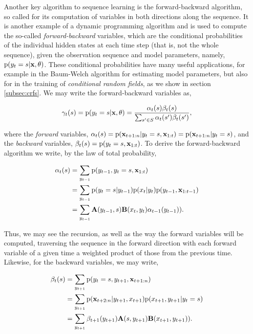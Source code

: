 Another key algorithm to sequence learning is the forward-backward algorithm, so called for its computation of variables in both directions along the sequence. It is another example of a dynamic programming algorithm and is used to compute the so-called \emph{forward-backward} variables, which are the conditional probabilities of the individual hidden states at each time step (that is, not the whole sequence), given the observation sequence and model parameters, namely, $\text{p}(y_t = s | \mathbf{x}, \theta)$. These conditional probabilities have many useful applications, for example in the Baum-Welch algorithm for estimating model parameters, but also for in the training of \emph{conditional random fields}, as we show in section \ref{subsec:crfs}. We may write the forward-backward variables as,

\begin{equation}
\gamma_t(s) = \text{p}(y_t = s | \mathbf{x}, \theta) = \frac{\alpha_t(s) \beta_t(s)}{\sum_{s' \in S} \alpha_t(s') \beta_t(s')},
\label{eq:fb}
\end{equation}

where the \emph{forward} variables, $\alpha_t(s) = \text{p}(\mathbf{x}_{t+1:n}|y_t = s, \mathbf{x}_{1:t}) = \text{p}(\mathbf{x}_{t+1:n}|y_t = s)$, and the \emph{backward} variables, $\beta_t(s) = \text{p}(y_t = s, \mathbf{x}_{1:t})$. To derive the forward-backward algorithm we write, by the law of total probability,

\begin{equation}
\begin{aligned}
\alpha_t(s) &= \sum_{y_{t-1}} \text{p}(y_{t-1}, y_t = s, \mathbf{x}_{1:t}) \\
& = \sum_{y_{t-1}} \text{p}(y_t = s|y_{t-1}) \text{p}(x_t|y_t) \text{p}(y_{t-1}, \mathbf{x}_{1:t-1}) \\
& = \sum_{y_{t-1}} \mathbf{A}(y_{t-1}, s) \mathbf{B}(x_t, y_t) \alpha_{t-1}(y_{t-1})).
\end{aligned}
\label{eq:forward}
\end{equation}

Thus, we may see the recursion, as well as the way the forward variables will be computed, traversing the sequence in the forward direction with each forward variable of a given time a weighted product of those from the previous time. Likewise, for the backward variables, we may write,

\begin{equation}
\begin{aligned}
\beta_t(s) &= \sum_{y_{t+1}} \text{p}(y_t = s, y_{t+1}, \mathbf{x}_{t+1:n}) \\
& = \sum_{y_{t+1}} \text{p}(\mathbf{x}_{t+2:n}|y_{t+1}, x_{t+1}) \text{p}(x_{t+1}, y_{t+1}|y_t = s) \\
& = \sum_{y_{t+1}} \beta_{t+1}(y_{t+1}) \mathbf{A}(s, y_{t+1}) \mathbf{B}(x_{t+1}, y_{t+1})).
\end{aligned}
\label{eq:backward}
\end{equation}

